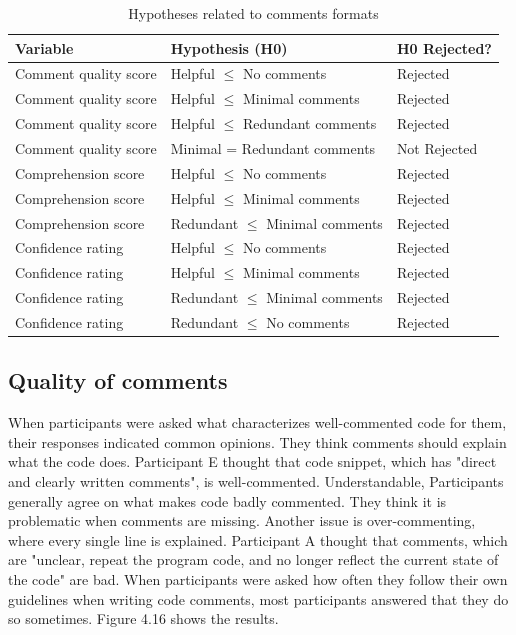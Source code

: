 \begin{table}[ht]
\centering
\small
\begin{tabular}{|p{4cm}|p{6cm}|p{2.5cm}|}
\hline
\rule{0pt}{1.2em}\textbf{Variable} & \textbf{Hypothesis (H0)} & \textbf{H0 Rejected?} \\[0.5em]
\hline
\rule{0pt}{1.2em}Comment quality score & Helpful $\leq$ No comments & Rejected \\[0.5em]
\hline
\rule{0pt}{1.2em}Comment quality score & Helpful $\leq$ Minimal comments & Rejected \\[0.5em]
\hline
\rule{0pt}{1.2em}Comment quality score & Helpful $\leq$ Redundant comments & Rejected \\[0.5em]
\hline
\rule{0pt}{1.2em}Comment quality score & Minimal = Redundant comments & Not Rejected \\[0.5em]
\hline
\rule{0pt}{1.2em}Comprehension score & Helpful $\leq$ No comments & Rejected \\[0.5em]
\hline
\rule{0pt}{1.2em}Comprehension score & Helpful $\leq$ Minimal comments & Rejected \\[0.5em]
\hline
\rule{0pt}{1.2em}Comprehension score & Redundant $\leq$ Minimal comments & Rejected \\[0.5em]
\hline
\rule{0pt}{1.2em}Confidence rating & Helpful $\leq$ No comments & Rejected \\[0.5em]
\hline
\rule{0pt}{1.2em}Confidence rating & Helpful $\leq$ Minimal comments & Rejected \\[0.5em]
\hline
\rule{0pt}{1.2em}Confidence rating & Redundant $\leq$ Minimal comments & Rejected \\[0.5em]
\hline
\rule{0pt}{1.2em}Confidence rating & Redundant $\leq$ No comments & Rejected \\[0.5em]
\hline
\end{tabular}
\caption{Hypotheses related to comments formats}
\end{table}



\subsection{Quality of comments}


When participants were asked what characterizes well-commented code for them, their responses indicated common opinions. They think comments should explain what the code does. Participant E thought that code snippet, which has "direct and clearly written comments", is well-commented. Understandable, Participants generally agree on what makes code badly commented. They think it is problematic when comments are missing. Another issue is over-commenting, where every single line is explained. Participant A thought that comments, which are "unclear, repeat the program code, and no longer reflect the current state of the code" are bad. When participants were asked how often they follow their own guidelines when writing code comments, most participants answered that they do so sometimes. Figure 4.16 shows the results.

